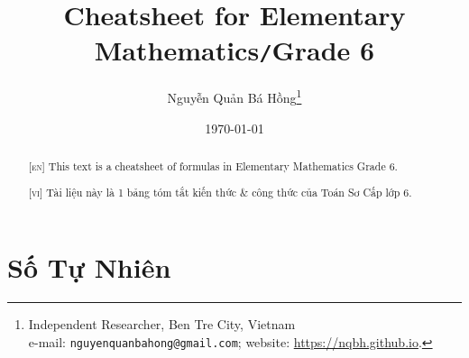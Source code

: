 \documentclass{article}
\title{Cheatsheet for Elementary Mathematics\texttt{/}Grade 6}
\author{\selectlanguage{vietnamese} Nguyễn Quản Bá Hồng\footnote{Independent Researcher, Ben Tre City, Vietnam\\e-mail: \texttt{nguyenquanbahong@gmail.com}; website: \url{https://nqbh.github.io}.}}
\date{\today}
\numberwithin{equation}{section}
\begin{document}
\maketitle
{}
\begin{abstract}
	\textsc{[en]} This text is a cheatsheet of formulas in Elementary Mathematics Grade 6.
	\vspace{2mm}

	\textsc{[vi]} Tài liệu này là 1 bảng tóm tắt kiến thức \& công thức của Toán Sơ Cấp lớp 6.
\end{abstract}
\tableofcontents
\newpage


\section{Số Tự Nhiên}
\end{document}
